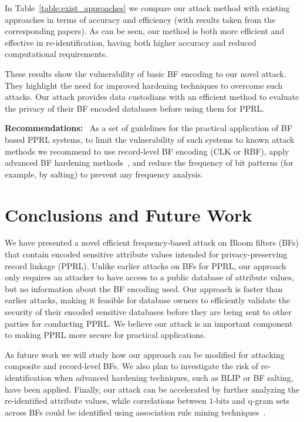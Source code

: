 \documentclass{llncs}
\begin{document}

In Table~\ref{table:exist_approaches} we compare our attack method
with existing approaches in terms of accuracy and efficiency (with
results taken from the corresponding papers). As can be seen, our
method is both more efficient and effective in re-identification,
having both higher accuracy and reduced computational requirements.

These results show the vulnerability of basic BF encoding to our
novel attack. They highlight the need for improved hardening
techniques to overcome such attacks. Our attack provides data
custodians with an efficient method to evaluate the privacy of their
BF encoded databases before using them for PPRL.

\smallskip
\textbf{Recommendations:}~
As a set of guidelines for the practical application of BF based PPRL
systems, to limit the vulnerability of such systems to known attack
methods we recommend to use record-level BF encoding (CLK or RBF),
apply advanced BF hardening methods~\cite{Sch16}, and reduce the
frequency of bit patterns (for example, by salting) to prevent any
frequency analysis.


\section{Conclusions and Future Work}
\label{sec-concl}

We have presented a novel efficient frequency-based attack on Bloom
filters (BFs) that contain encoded sensitive attribute values
intended for privacy-preserving record linkage (PPRL). Unlike earlier
attacks on BFs for PPRL, our approach only requires an attacker to
have access to a public database of attribute values, but no
information about the BF encoding used.
Our approach is faster than earlier attacks, making it feasible for
database owners to efficiently validate the security of their
encoded sensitive databases before they are being sent to other
parties for conducting PPRL. We believe our attack is an important 
component to making PPRL more secure for practical applications.

As future work we will study how our approach can be modified for
attacking composite and record-level BFs. We also plan to investigate
the risk of re-identification when advanced hardening techniques, such
as BLIP or BF salting, have been applied. Finally, our attack can be
accelerated by further analyzing the re-identified attribute values,
while correlations between $1$-bits and q-gram sets across BFs could
be identified using association rule mining
techniques~\cite{Ceg06}.
\end{document}
